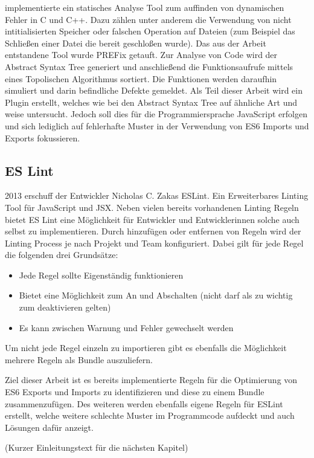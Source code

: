 \textcite{Bush} implementierte ein statisches Analyse Tool zum auffinden von dynamischen Fehler in C und C++. Dazu zählen unter anderem die Verwendung von nicht intitialisierten Speicher oder falschen Operation auf Dateien (zum Beispiel das Schließen einer Datei die bereit geschloßen wurde). Das aus der Arbeit entstandene Tool wurde PREFix getauft. Zur Analyse von Code wird der Abstract Syntax Tree generiert und anschließend die Funktionsaufrufe mittels eines Topolischen Algorithmus sortiert. Die Funktionen werden daraufhin simuliert und darin befindliche Defekte gemeldet. Als Teil dieser Arbeit wird ein Plugin erstellt, welches wie bei \textcite{Bush} den Abstract Syntax Tree auf ähnliche Art und weise untersucht. Jedoch soll dies für die Programmiersprache JavaScript erfolgen und sich lediglich auf fehlerhafte Muster in der Verwendung von ES6 Imports und Exports fokussieren.

\subsection{ES Lint}
2013 erschuff der Entwickler Nicholas C. Zakas ESLint. Ein Erweiterbares Linting Tool für JavaScript und JSX. Neben vielen bereits vorhandenen Linting Regeln bietet  ES Lint eine Möglichkeit für Entwickler und Entwicklerinnen solche auch selbst zu implementieren. Durch hinzufügen oder entfernen von Regeln wird der Linting Process je nach Projekt und Team konfiguriert. Dabei gilt für jede Regel die folgenden drei Grundsätze:
\begin{itemize}
  \item Jede Regel sollte Eigenständig funktionieren
  \item Bietet eine Möglichkeit zum An und Abschalten (nicht darf als zu wichtig zum deaktivieren gelten)
  \item Es kann zwischen Warnung und Fehler gewechselt werden
\end{itemize}
Um nicht jede Regel einzeln zu importieren gibt es ebenfalls die Möglichkeit mehrere Regeln als Bundle auszuliefern. \autocite{ESLintAbout}

Ziel dieser Arbeit ist es bereits implementierte Regeln für die Optimierung von ES6 Exports und Imports zu identifizieren und diese zu einem Bundle zusammenzufügen. Des weiteren werden ebenfalls eigene Regeln für ESLint erstellt, welche weitere schlechte Muster im Programmcode aufdeckt und auch Lösungen dafür anzeigt. \autocite{ESLintAbout}

(Kurzer Einleitungstext für die nächsten Kapitel)

